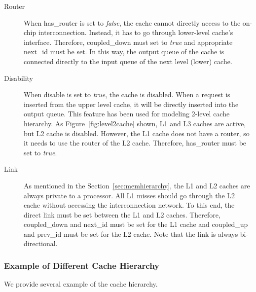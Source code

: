 \begin{description}
  \item[Router] When \textsf{has\_router} is set to \textit{false},
  the cache cannot directly access to the on-chip
  interconnection. Instead, it has to go through lower-level cache's
  interface. Therefore, \textsf{coupled\_down} must set
  to \textit{true} and appropriate \textsf{next\_id} must be set. In
  this way, the output queue of the cache is connected directly to the
  input queue of the next level (lower) cache.

  \item[Disability] When \textsf{disable} is set to \textit{true}, the
  cache is disabled. When a request is inserted from the upper level
  cache, it will be directly inserted into the output queue. This
  feature has been used for modeling 2-level cache hierarchy. As
  Figure~\ref{fig:level2cache} shown, L1 and L3 caches are active, but
  L2 cache is disabled. However, the L1 cache does not have a router,
  so it needs to use the router of the L2
  cache. Therefore, \textsf{has\_router} must be set to \textit{true}.

  \item[Link] As mentioned in the Section~\ref{sec:memhierarchy}, the
  L1 and L2 caches are always private to a processor. All L1 misses
  should go through the L2 cache without accessing the interconnection
  network. To this end, the direct link must be set between the L1 and
  L2 caches. Therefore, \textsf{coupled\_down} and \textsf{next\_id}
  must be set for the L1 cache and \textsf{coupled\_up}
  and \textsf{prev\_id} must be set for the L2 cache. Note that the
  link is always bi-directional.

\end{description}

\subsubsection{Example of Different Cache Hierarchy}

We provide several example of the cache hierarchy.

